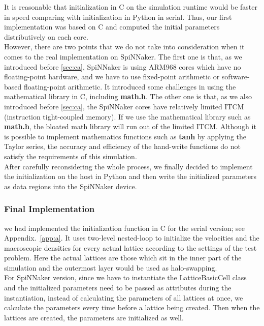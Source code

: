 It is reasonable that initialization in C on the simulation runtime would be faster in speed comparing with initialization in Python in serial. Thus, our first implementation was based on C and computed the initial parameters distributively on each core. \\

However, there are two points that we do not take into consideration when it comes to the real implementation on SpiNNaker. The first one is that, as we introduced before \ref{sec:ca}, SpiNNaker is using ARM968 cores which have no floating-point hardware, and we have to use fixed-point arithmetic or software-based floating-point arithmetic. It introduced some challenges in using the mathematical library in C, including \textbf{math.h}. The other one is that, as we also introduced before \ref{sec:ca}, the SpiNNaker cores have relatively limited ITCM (instruction tight-coupled memory). If we use the mathematical library such as \textbf{math.h}, the bloated math library will run out of the limited ITCM. Although it is possible to implement mathematics functions such as \textbf{tanh} by applying the Taylor series, the accuracy and efficiency of the hand-write functions do not satisfy the requirements of this simulation.\\

After carefully reconsidering the whole process, we finally decided to implement the initialization on the host in Python and then write the initialized parameters as data regions into the SpiNNaker device. \\
\subsubsection{Final Implementation}
we had implemented the initialization function in C for the serial version; see Appendix.~\ref{app:a}. It uses two-level nested-loop to initialize the velocities and the macroscopic densities for every actual lattice according to the settings of the test problem. Here the actual lattices are those which sit in the inner part of the simulation and the outermost layer would be used as halo-swapping.\\

For SpiNNaker version, since we have to instantiate the LatticeBasicCell class and the initialized parameters need to be passed as attributes during the instantiation, instead of calculating the parameters of all lattices at once, we calculate the parameters every time before a lattice being created. Then when the lattices are created, the parameters are initialized as well.\\

